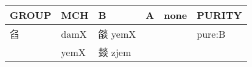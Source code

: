 \documentclass[14pt,a4paper]{scrartcl}
\begin{document}
\begin{longtable}[c]{@{}llllll@{}}
\toprule
\begin{minipage}[b]{0.14\columnwidth}\raggedright\strut
GROUP
\strut\end{minipage} &
\begin{minipage}[b]{0.14\columnwidth}\raggedright\strut
MCH
\strut\end{minipage} &
\begin{minipage}[b]{0.14\columnwidth}\raggedright\strut
B
\strut\end{minipage} &
\begin{minipage}[b]{0.14\columnwidth}\raggedright\strut
A
\strut\end{minipage} &
\begin{minipage}[b]{0.14\columnwidth}\raggedright\strut
none
\strut\end{minipage} &
\begin{minipage}[b]{0.14\columnwidth}\raggedright\strut
PURITY
\strut\end{minipage}\tabularnewline
\midrule
\endhead
\begin{minipage}[t]{0.14\columnwidth}\raggedright\strut
臽
\strut\end{minipage} &
\begin{minipage}[t]{0.14\columnwidth}\raggedright\strut
damX
\strut\end{minipage} &
\begin{minipage}[t]{0.14\columnwidth}\raggedright\strut
燄 yemX
\strut\end{minipage} &
\begin{minipage}[t]{0.14\columnwidth}\raggedright\strut
\strut\end{minipage} &
\begin{minipage}[t]{0.14\columnwidth}\raggedright\strut
\strut\end{minipage} &
\begin{minipage}[t]{0.14\columnwidth}\raggedright\strut
pure:B
\strut\end{minipage}\tabularnewline
\begin{minipage}[t]{0.14\columnwidth}\raggedright\strut
𤍽
\strut\end{minipage} &
\begin{minipage}[t]{0.14\columnwidth}\raggedright\strut
yemX
\strut\end{minipage} &
\begin{minipage}[t]{0.14\columnwidth}\raggedright\strut
燅 zjem
\strut\end{minipage} &
\begin{minipage}[t]{0.14\columnwidth}\raggedright\strut

\end{minipage}
\end{longtable}
\end{document}
